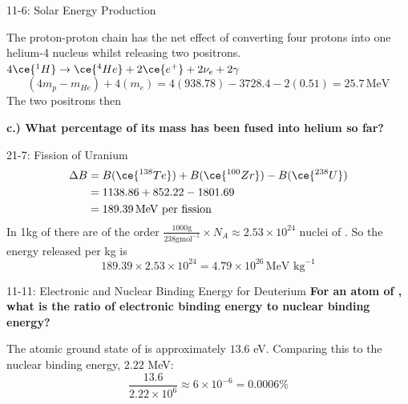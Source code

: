 \begin{example}{1}{1-6: Solar Energy Production}


The proton-proton chain has the net effect of converting four protons into one helium-4 nucleus whilst releasing two positrons.
\(4\ce{^1H} \to \ce{^4He}+2\ce{e^+}+2\nu_e + 2\gamma \)
\[(4m_p -m_{He})+4(m_e) = 4(938.78)-3728.4-2(0.51) = 25.7\,\text{MeV}\]
The two positrons then 

\textbf{c.) What percentage of its mass has been fused into helium so far?}

    
\end{example}

\begin{example}{2}{1-7: Fission of Uranium}
\begin{equation*}
    \begin{split}
    \Delta B &= B(\ce{^{138}Te})+B(\ce{^{100}Zr})-B(\ce{^{238}U})\\
             &= 1138.86 + 852.22 - 1801.69\\
             &= 189.39 \,\text{MeV per fission}
\end{split}
\end{equation*}
In 1kg of  there are of the order \(\frac{1000\text{g}}{238\text{gmol}^{-1}}\times N_A \approx 2.53 \times 10^{24}\text{ nuclei}\) of . So the energy released per kg is 
\[189.39 \times 2.53 \times 10^{24} = 4.79 \times 10^{26}\,\text{MeV kg}^{-1}\]
\end{example}

\begin{example}{1}{1-11: Electronic and Nuclear Binding Energy for Deuterium}
\textbf{For an atom of , what is the ratio of electronic binding energy to nuclear binding energy?}

The atomic ground state of  is approximately \(13.6\) eV. Comparing this to the nuclear binding energy, \(2.22\) MeV:
\[\frac{13.6}{2.22 \times 10^6} \approx 6 \times 10^{-6} = 0.0006\%\]
\end{example}

